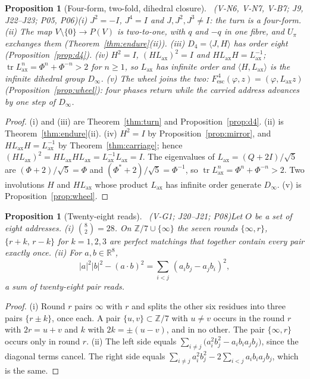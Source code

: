 \documentclass[11pt,a4paper]{article}
\newcommand{\RR}{\mathbb{R}}\newcommand{\QQ}{\mathbb{Q}}\newcommand{\ZZ}{\mathbb{Z}}
\newcommand{\Lax}{L_{\mathrm{ax}}}\newcommand{\Lpr}{L_{\mathrm{pr}}}
\newcommand{\Fesc}{F_{\mathrm{esc}}}
\theoremstyle{plain}
\newtheorem{prop}[thm]{Proposition}
\theoremstyle{definition}
\theoremstyle{remark}
\begin{document}
\begin{prop}[Four-form, two-fold, dihedral closure]\Sder\ \textit{(V-N6, V-N7, V-B7; J9, J22--J23; P05, P06)}\label{prop:dinf}
(i) $J^2=-I$, $J^4=I$ and $J,J^2,J^3\ne I$: the turn is a four-form. (ii) The map $V\setminus\{0\}\to P(V)$ is two-to-one, with $q$ and $-q$ in one fibre, and $U_\pi$ exchanges them (Theorem~\ref{thm:endure}(ii)). (iii) $D_4=\langle J,H\rangle$ has order eight (Proposition~\ref{prop:d4}). (iv) $H^2=I$, $(H\Lax)^2=I$ and $H\Lax H=\Lax^{-1}$; $\operatorname{tr}\Lax^n=\Phi^n+\Phi^{-n}>2$ for $n\ge1$, so $\Lax$ has infinite order and $\langle H,\Lax\rangle$ is the infinite dihedral group $D_\infty$. (v) The wheel joins the two: $\Fesc^{\,4}(\varphi,z)=(\varphi,\Lax z)$ (Proposition~\ref{prop:wheel}): four phases return while the carried address advances by one step of $D_\infty$.
\end{prop}
\begin{proof}
(i) and (iii) are Theorem~\ref{thm:turn} and Proposition~\ref{prop:d4}. (ii) is Theorem~\ref{thm:endure}(ii). (iv) $H^2=I$ by Proposition~\ref{prop:mirror}, and $H\Lax H=\Lax^{-1}$ by Theorem~\ref{thm:carriage}; hence $(H\Lax)^2=H\Lax H\Lax=\Lax^{-1}\Lax=I$. The eigenvalues of $\Lax=(Q+2I)/\sqrt5$ are $(\Phi+2)/\sqrt5=\Phi$ and $(\Phi^{\ast}+2)/\sqrt5=\Phi^{-1}$, so $\operatorname{tr}\Lax^n=\Phi^n+\Phi^{-n}>2$. Two involutions $H$ and $H\Lax$ whose product $\Lax$ has infinite order generate $D_\infty$. (v) is Proposition~\ref{prop:wheel}.
\end{proof}

\begin{prop}[Twenty-eight reads]\Sder\ \textit{(V-G1; J20--J21; P08)}\label{prop:k8}
Let $O$ be a set of eight addresses. (i) $\binom82=28$. On $\mathbb Z/7\cup\{\infty\}$ the seven rounds $\{\infty,r\}$, $\{r+k,\,r-k\}$ for $k=1,2,3$ are perfect matchings that together contain every pair exactly once. (ii) For $a,b\in\RR^8$,
\[
|a|^2|b|^2-(a\cdot b)^2=\sum_{i<j}\,(a_ib_j-a_jb_i)^2,
\]
a sum of twenty-eight pair reads.
\end{prop}
\begin{proof}
(i) Round $r$ pairs $\infty$ with $r$ and splits the other six residues into three pairs $\{r\pm k\}$, once each. A pair $\{u,v\}\subset\mathbb Z/7$ with $u\ne v$ occurs in the round $r$ with $2r=u+v$ and $k$ with $2k=\pm(u-v)$, and in no other. The pair $\{\infty,r\}$ occurs only in round $r$. (ii) The left side equals $\sum_{i\ne j}\bigl(a_i^2b_j^2-a_ib_ia_jb_j\bigr)$, since the diagonal terms cancel. The right side equals $\sum_{i\ne j}a_i^2b_j^2-2\sum_{i<j}a_ib_ia_jb_j$, which is the same.
\end{proof}
\end{document}
